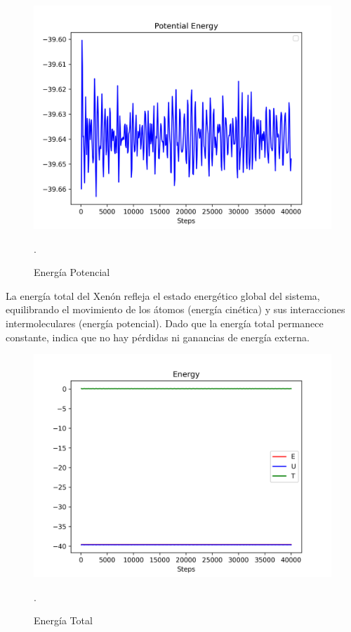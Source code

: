 \documentclass[10pt,letterpaper,twocolumn]{article}
\begin{document}
\begin{figure}[h]
	\centering
	\includegraphics[scale=0.50]{energia2.png}
	\caption{Energía Potencial}.
\end{figure}

La energía total del Xenón refleja el estado energético global del sistema, equilibrando 
el movimiento de los átomos (energía cinética) y sus interacciones intermoleculares 
(energía potencial). Dado que la energía total permanece constante, indica que no hay pérdidas 
ni ganancias de energía externa.

\begin{figure}[h]
	\centering
	\includegraphics[scale=0.50]{energiat (4).png}
	\caption{Energía Total}.
\end{figure}
\end{document}
